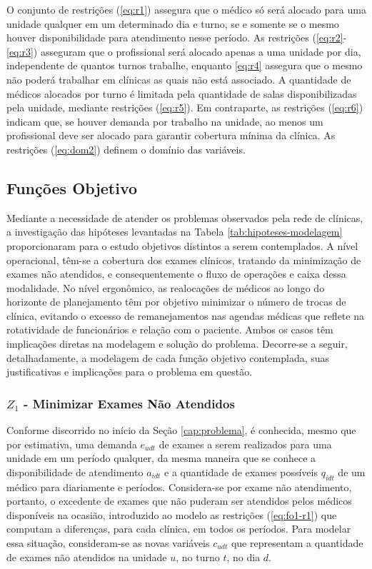 O conjunto de restrições (\ref{eq:r1}) assegura que o médico só será alocado para uma unidade qualquer em um determinado dia e turno, se e somente se o mesmo houver disponibilidade para atendimento nesse período. As restrições (\ref{eq:r2}-\ref{eq:r3}) asseguram que o profissional será alocado apenas a uma unidade por dia, independente de quantos turnos trabalhe, enquanto \ref{eq:r4} assegura que o mesmo não poderá trabalhar em clínicas as quais não está associado. A quantidade de médicos alocados por turno é limitada pela quantidade de salas disponibilizadas pela unidade, mediante restrições (\ref{eq:r5}). Em contraparte, as restrições (\ref{eq:r6}) indicam que, se houver demanda por trabalho na unidade, ao menos um profissional deve ser alocado para garantir cobertura mínima da clínica. As restrições (\ref{eq:dom2}) definem o domínio das variáveis.

\subsection{Funções Objetivo}
Mediante a necessidade de atender os problemas observados pela rede de clínicas, a investigação das hipóteses levantadas na Tabela \ref{tab:hipoteses-modelagem} proporcionaram para o estudo objetivos distintos a serem contemplados. A nível operacional, têm-se a cobertura dos exames clínicos, tratando da minimização de exames não atendidos, e consequentemente o fluxo de operações e caixa dessa modalidade. No nível ergonômico, as realocações de médicos ao longo do horizonte de planejamento têm por objetivo minimizar o número de trocas de clínica, evitando o excesso de remanejamentos nas agendas médicas que reflete na rotatividade de funcionários e relação com o paciente. Ambos os casos têm implicações diretas na modelagem e solução do problema. Decorre-se a seguir, detalhadamente, a modelagem de cada função objetivo contemplada, suas justificativas e implicações para o problema em questão.

\subsubsection{$Z_1$ - Minimizar Exames Não Atendidos}
\label{subsec:fo1}

Conforme discorrido no início da Seção \ref{cap:problema}, é conhecida, mesmo que por estimativa, uma demanda $e_{udt}$ de exames a serem realizados para uma unidade em um período qualquer, da mesma maneira que se conhece a disponibilidade de atendimento $a_{idt}$ e a quantidade de exames possíveis $q_{idt}$ de um médico para diariamente e períodos. Considera-se por exame não atendimento, portanto, o excedente de exames que não puderam ser atendidos pelos médicos disponíveis na ocasião, introduzido ao modelo as restrições (\ref{eq:fo1-r1}) que computam a diferenças, para cada clínica, em todos os períodos. Para modelar essa situação, consideram-se as novas variáveis $c_{udt}$ que representam a quantidade  de exames não atendidos na unidade  $u$, no turno $t$, no dia $d$.

